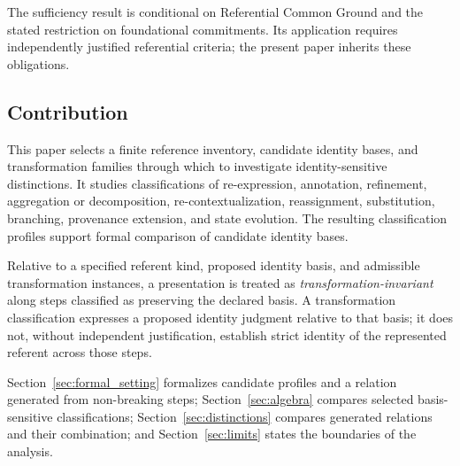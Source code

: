 The sufficiency result is conditional on Referential Common Ground
and the stated restriction on foundational commitments.
Its application requires independently justified referential criteria;
the present paper inherits these obligations.

\subsection{Contribution}
\label{subsec:contribution}

This paper selects a finite reference inventory, candidate identity
bases, and transformation families through which to investigate
identity-sensitive distinctions.
It studies classifications of
re-expression, annotation, refinement, aggregation or decomposition,
re-contextualization, reassignment, substitution, branching,
provenance extension, and state evolution.
The resulting classification
profiles support formal comparison of candidate identity bases.

\begin{definition}
  \label{se200.def.TransformationInvariantIdentity}
  Relative to a specified referent kind, proposed identity basis, and
  admissible transformation instances, a presentation is treated as
  \emph{transformation-invariant} along steps classified as preserving
  the declared basis.
  A transformation classification expresses a
  proposed identity judgment relative to that basis; it does not,
  without independent justification, establish strict identity of
  the represented referent across those steps.
\end{definition}

Section~\ref{sec:formal_setting} formalizes candidate profiles and a
relation generated from non-breaking steps;
Section~\ref{sec:algebra} compares selected basis-sensitive classifications;
Section~\ref{sec:distinctions} compares generated relations and their
combination; and Section~\ref{sec:limits} states the boundaries of the
analysis.
